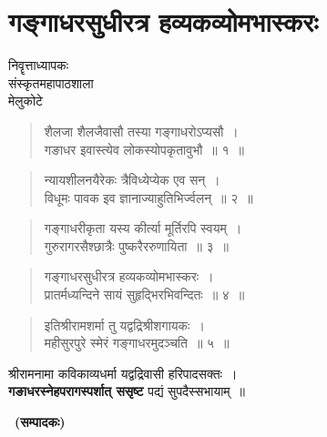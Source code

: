 {\fontsize{15}{17}\selectfont
\presetvalues
\chapter{गङ्गाधरसुधीरत्र हव्यकव्योमभास्करः}

\begin{center}
\smallskip

निवॄत्ताध्यापकः\\
संस्कृतमहापाठशाला\\
मेलुकोटे
\addrule
\end{center}

\begin{verse}
शैलजा शैलजैवासौ तस्या गङ्गाधरोऽप्यसौ~।\\
गङाधर इवास्त्येव लोकस्योपकृतावुभौ~॥ १~॥
\end{verse}

\begin{verse}
न्यायशीलनयैरेकः त्रैविध्येप्येक एव सन्~।\\
विधूमः पावक इव ज्ञानाज्याहुतिभिर्ज्वलन्~॥ २~॥
\end{verse}

\begin{verse}
गङ्गाधरीकृता यस्य कीर्त्या मूर्तिरपि स्वयम्~।\\
गुरुरागरसैश्छात्रैः पुष्करैररुणायिता~॥ ३~॥
\end{verse}

\begin{verse}
गङ्गाधरसुधीरत्र हव्यकव्योमभास्करः~।\\
प्रातर्मध्यन्दिने सायं सुहृद्भिरभिवन्दितः~॥ ४~॥
\end{verse}

\begin{verse} 
इतिश्रीरामशर्मा तु यद्वद्रिश्रीशगायकः~।\\
महीसुरपुरे स्मेरं गङ्गाधरमुदञ्चति~॥ ५~॥
\end{verse}

\begin{center}
श्रीरामनामा कविकाव्यधर्मा यद्वद्रिवासी हरिपादसक्तः~।\\
\textbf{गङाधरस्नेहपरागस्पर्शात् ससृष्ट} पद्यं सुपदैस्सभायाम्~॥ 
\end{center}

~\hfill\textbf{(सम्पादकः)}

\articleend
}
